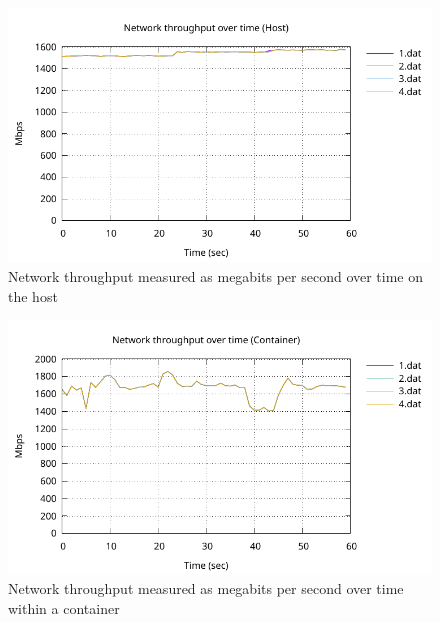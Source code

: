 \begin{figure}[H]
    \centering
    \includegraphics[width=1\textwidth]{images/results/network-host-throughput.pdf}
    \caption{Network throughput measured as megabits per second over time on the host}
    \label{ticket-builder-class}
\end{figure}

\begin{figure}[H]
    \centering
    \includegraphics[width=1\textwidth]{images/results/network-throughput-container.pdf}
    \caption{Network throughput measured as megabits per second over time within a container}
    \label{ticket-builder-class}
\end{figure}